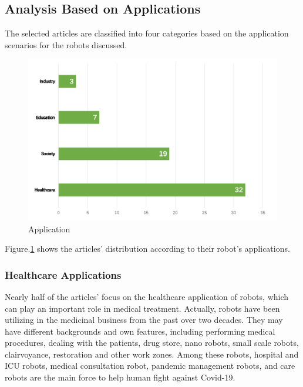 \documentclass[a4paper]{article}
\begin{document}
\subsection{Analysis Based on Applications }
The selected articles are classified into four categories based on the application scenarios for the robots discussed.
\begin{figure}[H]
    \centering
    \includegraphics[scale=0.2]{Application.png}
    \caption{Application}
    \label{Application}
\end{figure}
Figure.\ref{Application} shows the articles' distribution according to their robot's applications.
\subsubsection{Healthcare Applications} 
    Nearly half of the articles' focus on the healthcare application of robots, which can play an important role in medical treatment. Actually, robots have been utilizing in the medicinal business from the past over two decades\cite{3}. They may have different backgrounds and own features, including performing medical procedures, dealing with the patients, drug store, nano robots, small scale robots, clairvoyance, restoration and other work zones. Among these robots, hospital and ICU robots, medical consultation robot, pandemic management robots, and care robots are the main force to help human fight against Covid-19.
\end{document}
